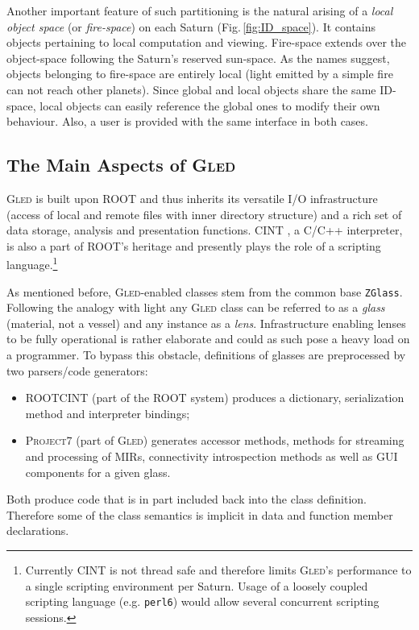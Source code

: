 \documentclass[a4paper,11pt]{article}
\def\gled{\textsc{Gled}\xspace}
\def\p7{\textsc{Project7}\xspace}
\def\smalltt#1{{\small\texttt{#1}}}
\def\foottt#1{{\footnotesize\texttt{#1}}}
\begin{document}
Another important feature of such partitioning is the natural arising
of a \emph{local object space} (or \emph{fire-space}) on each Saturn
(Fig.\,\ref{fig:ID_space}). It contains objects pertaining to local
computation and viewing. Fire-space extends over the object-space
following the Saturn's reserved sun-space. As the names suggest,
objects belonging to fire-space are entirely local (light emitted by a
simple fire can not reach other planets). Since global and local
objects share the same ID-space, local objects can easily
reference the global ones to modify their own behaviour. Also, a
user is provided with the same interface in both cases.


\subsection{The Main Aspects of \gled}

\gled is built upon ROOT \cite{root} and thus inherits its versatile
I/O infrastructure (access of local and remote files with inner
directory structure) and a rich set of data storage, analysis and
presentation functions. CINT \cite{cint}, a C/C++ interpreter, is also
a part of ROOT's heritage and presently plays the role of a scripting
language.\footnote{Currently CINT is not thread safe and therefore
  limits \gled's performance to a single scripting environment per
  Saturn. Usage of a loosely coupled scripting language (e.g.
  \foottt{perl6}) would allow several concurrent scripting sessions.}

As mentioned before, \gled-enabled classes stem from the common base
\smalltt{ZGlass}. Following the analogy with light any \gled class can be
referred to as a \emph{glass} (material, not a vessel) and any
instance as a \emph{lens}. Infrastructure enabling lenses to be fully
operational is rather elaborate and could as such pose a heavy load on
a programmer. To bypass this obstacle, definitions of glasses are
preprocessed by two parsers/code generators:
\begin{itemize}
\item ROOTCINT (part of the ROOT system) produces
  a dictionary, serialization method and interpreter bindings;
\item \p7 (part of \gled) generates accessor methods, methods for
  streaming and processing of MIRs, connectivity introspection methods
  as well as GUI components for a given glass.
\end{itemize}
Both produce code that is in part included back into the class
definition. Therefore some of the class semantics is implicit in
data and function member declarations.
\end{document}
